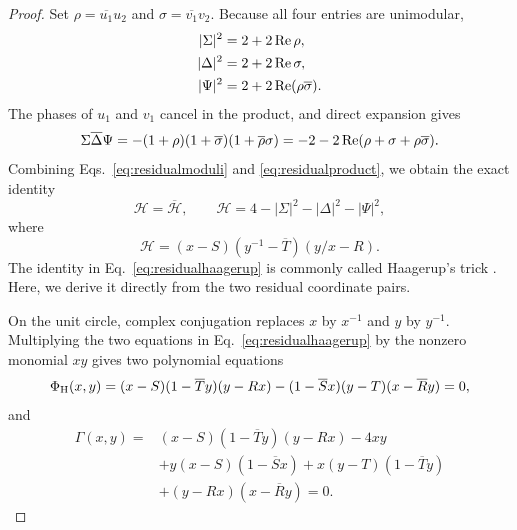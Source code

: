\begin{proof}
Set $\rho=\overline{u_1}u_2$ and $\sigma=\overline{v_1}v_2$.  Because all four entries are unimodular,
\begin{equation}
\begin{aligned}
|\Sigma|^2&=2+2\operatorname{Re}\rho,\\
|\Delta|^2&=2+2\operatorname{Re}\sigma,\\
|\Psi|^2&=2+2\operatorname{Re}(\rho\overline\sigma).
\end{aligned}
\label{eq:residualmoduli}
\end{equation}
The phases of $u_1$ and $v_1$ cancel in the product, and direct expansion gives
\begin{equation}
\Sigma\overline\Delta\Psi
=-(1+\rho)(1+\overline\sigma)(1+\overline\rho\sigma)
=-2-2\operatorname{Re}(\rho+\sigma+\rho\overline\sigma).
\label{eq:residualproduct}
\end{equation}
Combining Eqs.~\eqref{eq:residualmoduli} and \eqref{eq:residualproduct}, we obtain the exact identity
\begin{equation}
\mathcal H=\overline{\mathcal H},
\qquad
\mathcal H=4-|\Sigma|^2-|\Delta|^2-|\Psi|^2,
\label{eq:residualhaagerup}
\end{equation}
where
\begin{equation}
\mathcal H=(x-S)(y^{-1}-\overline T)(y/x-R).
\label{eq:Hcal}
\end{equation}
The identity in Eq.~\eqref{eq:residualhaagerup} is commonly called Haagerup's trick \MainCiteHaagerupSzollosi. Here, we derive it directly from the two residual coordinate pairs.

On the unit circle, complex conjugation replaces $x$ by $x^{-1}$ and $y$ by $y^{-1}$.  Multiplying the two equations in Eq.~\eqref{eq:residualhaagerup} by the nonzero monomial $xy$ gives two polynomial equations
\begin{equation}
\Phi_{\rm H}(x,y)=(x-S)(1-\overline T y)(y-Rx)
-(1-\overline Sx)(y-T)(x-\overline R y)=0,
\label{eq:Phi}
\end{equation}
and
\begin{equation}
\begin{aligned}
\Gamma(x,y)={}&(x-S)(1-\overline T y)(y-Rx)-4xy\\
&+y(x-S)(1-\overline Sx)
+x(y-T)(1-\overline T y)\\
&+(y-Rx)(x-\overline R y)=0.
\end{aligned}
\label{eq:Gamma}
\end{equation}


\end{proof}

